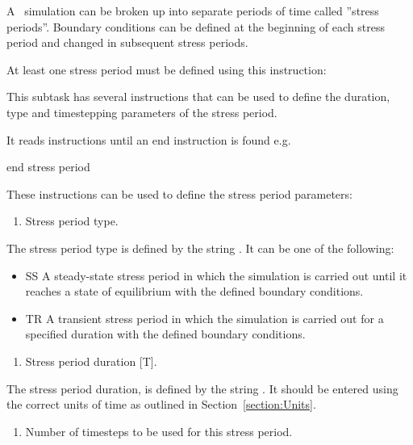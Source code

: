 \label{section:StressPeriods}
A \mfus\ simulation can be broken up into separate periods of time called ''stress periods''.  Boundary conditions can be defined at the beginning of each stress period and changed in subsequent stress periods.

At least one stress period must be defined using this instruction:

    {This subtask has several instructions that can be used to define the duration, type and timestepping parameters of the stress period.

    It reads instructions until an \textsf{end} instruction is found e.g.\:

    {\Large \sf end stress period}
    }

These instructions can be used to define the stress period parameters:

    {
        \squish
        \begin{enumerate}
        \item {}  Stress period type.
        \end{enumerate}
        The stress period type is defined by the string .  It can be one of the following:
        \begin{itemize}
            \item \textsf{SS} A steady-state stress period in which the simulation is carried out until it reaches a state of equilibrium with the defined boundary conditions.
            \item \textsf{TR} A transient stress period in which the simulation is carried out for a specified duration with the defined boundary conditions.
        \end{itemize}
        \squish
    }

    {
        \squish
        \begin{enumerate}
        \item {}  Stress period duration [T].
        \end{enumerate}
        The stress period duration, is defined by the string .  It should be entered using the correct units of time as outlined in Section~\ref{section:Units}.
    }

    {
        \squish
        \begin{enumerate}
        \item {}  Number of timesteps to be used for this stress period.
        \end{enumerate}
        \squish
    }

